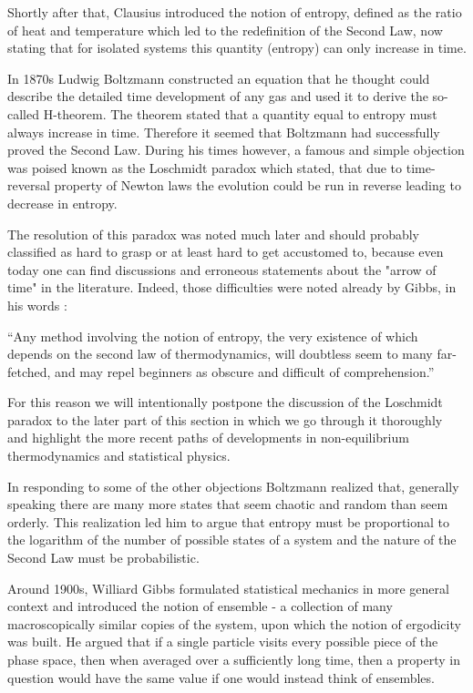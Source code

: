 \documentclass[a4paper,12pt]{article}
\begin{document}
Shortly after that, Clausius introduced the notion of entropy, defined as the ratio of heat and temperature which led to the redefinition of the Second Law, now stating that for isolated systems this quantity (entropy) can only increase in time.

In 1870s Ludwig Boltzmann constructed an equation that he thought could describe the detailed time development of any gas and used it to derive the so-called H-theorem. The theorem stated that a quantity equal to entropy must always increase in time. Therefore it seemed that Boltzmann had successfully proved the Second Law. During his times however, a famous and simple objection was poised known as the Loschmidt paradox which stated, that due to time-reversal property of Newton laws the evolution could be run in reverse leading to decrease in entropy. 

The resolution of this paradox was noted much later and should probably classified as hard to grasp or at least hard to get accustomed to, because even today one can find discussions and erroneous statements about the "arrow of time" in the literature. Indeed, those difficulties were noted already by Gibbs, in his words \cite{Gibbs:1928tw}:

\begin{displayquote}
“Any method involving the notion of entropy, the very existence of which depends on the second law of thermodynamics, will doubtless seem to many far-fetched, and may repel beginners as obscure and difficult of comprehension.”
\end{displayquote}

For this reason we will intentionally postpone the discussion of the Loschmidt paradox to the later part of this section in which we go through it thoroughly and highlight the more recent paths of developments in non-equilibrium thermodynamics and statistical physics.

In responding to some of the other objections Boltzmann realized that, generally speaking there are many more states that seem chaotic and random than seem orderly. This realization led him to argue that entropy must be proportional to the logarithm of the number of possible states of a system and the nature of the Second Law must be probabilistic.

Around 1900s, Williard Gibbs formulated statistical mechanics in more general context and introduced the notion of ensemble - a collection of many macroscopically similar copies of the system, upon which the notion of ergodicity was built. 
He argued that if a single particle visits every possible piece of the phase space, then when averaged over a sufficiently long time, then a property in question would have the same value if one would instead think of ensembles. 
\end{document}
